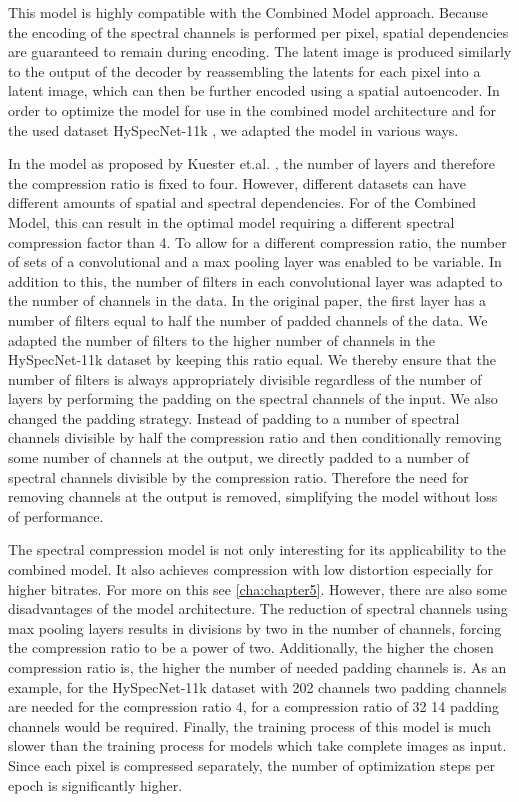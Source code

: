 This model is highly compatible with the Combined Model approach. Because the encoding of the spectral channels is performed per pixel, spatial dependencies are guaranteed to remain during encoding. The latent image is produced similarly to the output of the decoder by reassembling the latents for each pixel into a latent image, which can then be further encoded using a spatial autoencoder. In order to optimize the model for use in the combined model architecture and for the used dataset HySpecNet-11k \citep{fuchs_hyspecnet-11k_2023}, we adapted the model in various ways.

In the model as proposed by Kuester et.al. \citep{kuester_1d-convolutional_2021,kuester_transferability_2022}, the number of layers and therefore the compression ratio is fixed to four. However, different datasets can have different amounts of spatial and spectral dependencies. For of the Combined Model, this can result in the optimal model requiring a different spectral compression factor than 4. To allow for a different compression ratio, the number of sets of a convolutional and a max pooling layer was enabled to be variable. In addition to this, the number of filters in each convolutional layer was adapted to the number of channels in the data. In the original paper, the first layer has a number of filters equal to half the number of padded channels of the data. We adapted the number of filters to the higher number of channels in the HySpecNet-11k dataset by keeping this ratio equal. We thereby ensure that the number of filters is always appropriately divisible regardless of the number of layers by performing the padding on the spectral channels of the input. We also changed the padding strategy. Instead of padding to a number of spectral channels divisible by half the compression ratio and then conditionally removing some number of channels at the output, we directly padded to a number of spectral channels divisible by the compression ratio. Therefore the need for removing channels at the output is removed, simplifying the model without loss of performance.

The spectral compression model is not only interesting for its applicability to the combined model. It also achieves compression with low distortion especially for higher bitrates. For more on this see \autoref{cha:chapter5}. However, there are also some disadvantages of the model architecture. The reduction of spectral channels using max pooling layers results in divisions by two in the number of channels, forcing the compression ratio to be a power of two. Additionally, the higher the chosen compression ratio is, the higher the number of needed padding channels is. As an example, for the HySpecNet-11k dataset with 202 channels two padding channels are needed for the compression ratio 4, for a compression ratio of 32 14 padding channels would be required. Finally, the training process of this model is much slower than the training process for models which take complete images as input. Since each pixel is compressed separately, the number of optimization steps per epoch is significantly higher.
